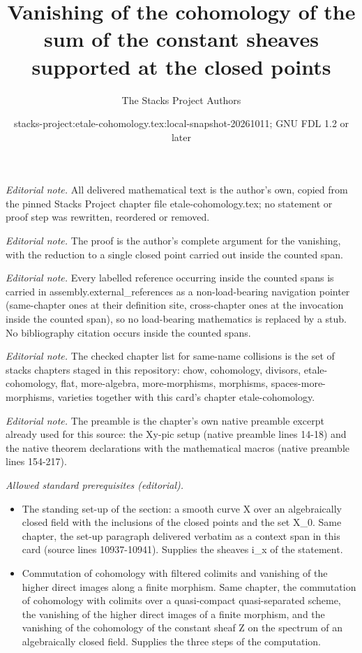 \documentclass[10pt,a4paper]{amsart}
\title{Vanishing of the cohomology of the sum of the constant sheaves supported at the closed points}
\author{The Stacks Project Authors}
\date{stacks-project:etale-cohomology.tex:local-snapshot-20261011; GNU FDL 1.2 or later}
\theoremstyle{plain}
\theoremstyle{definition}
\theoremstyle{remark}
\numberwithin{equation}{subsection}
\begin{document}
\maketitle
\noindent\textit{Editorial note.} All delivered mathematical text is the author's own, copied from the pinned Stacks Project chapter file etale-cohomology.tex; no statement or proof step was rewritten, reordered or removed.\par\medskip
\noindent\textit{Editorial note.} The proof is the author's complete argument for the vanishing, with the reduction to a single closed point carried out inside the counted span.\par\medskip
\noindent\textit{Editorial note.} Every labelled reference occurring inside the counted spans is carried in assembly.external\_references as a non-load-bearing navigation pointer (same-chapter ones at their definition site, cross-chapter ones at the invocation inside the counted span), so no load-bearing mathematics is replaced by a stub. No bibliography citation occurs inside the counted spans.\par\medskip
\noindent\textit{Editorial note.} The checked chapter list for same-name collisions is the set of stacks chapters staged in this repository: chow, cohomology, divisors, etale-cohomology, flat, more-algebra, more-morphisms, morphisms, spaces-more-morphisms, varieties together with this card's chapter etale-cohomology.\par\medskip
\noindent\textit{Editorial note.} The preamble is the chapter's own native preamble excerpt already used for this source: the Xy-pic setup (native preamble lines 14-18) and the native theorem declarations with the mathematical macros (native preamble lines 154-217).\par\medskip
\noindent\textit{Allowed standard prerequisites (editorial).}\begin{itemize}
\item The standing set-up of the section: a smooth curve X over an algebraically closed field with the inclusions of the closed points and the set X\_0. Same chapter, the set-up paragraph delivered verbatim as a context span in this card (source lines 10937-10941). Supplies the sheaves i\_x of the statement.
\item Commutation of cohomology with filtered colimits and vanishing of the higher direct images along a finite morphism. Same chapter, the commutation of cohomology with colimits over a quasi-compact quasi-separated scheme, the vanishing of the higher direct images of a finite morphism, and the vanishing of the cohomology of the constant sheaf Z on the spectrum of an algebraically closed field. Supplies the three steps of the computation.
\end{itemize}\medskip
\end{document}
